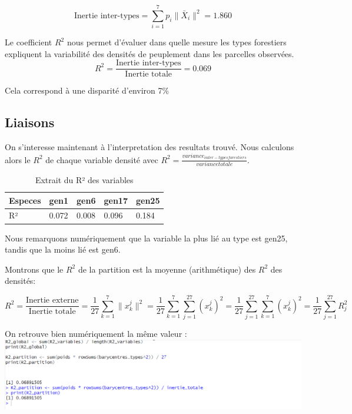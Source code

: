 \documentclass{article}
\begin{document}
\[
\text{Inertie inter-types} = \sum_{i=1}^{7} p_i \|\bar{X}_i\|^2 = 1.860
\]

Le coefficient $R^2$ nous permet d'évaluer dans quelle mesure les types forestiers expliquent la variabilité des densités de peuplement dans les parcelles observées.
\[
R^2 = \frac{\text{Inertie inter-types}}{\text{Inertie totale}}=0.069
\]

Cela correspond à une disparité d'environ 7\%

\subsection{Liaisons}

On s'interesse maintenant à l'interpretation des resultats trouvé. Nous calculons alors le $R^2$ de chaque variable densité avec
 $R^2 = \frac{variance_{inter -typesforestiers}}{variance totale}$.

\begin{table}[H]
    \centering
    \begin{tabular}{|l|l|l|l|l|}
    \hline
    Especes & gen1  & gen6  & gen17 & gen25 \\ \hline
    R²      & 0.072 & 0.008 & 0.096 & 0.184 \\ \hline
    \end{tabular}
    \centering
    \caption{Extrait du R² des variables}
    \end{table}


Nous remarquons numériquement que la variable la plus lié au type est gen25, tandis que la moins lié est gen6.

Montrons que le $R^2$ de la partition est la moyenne (arithmétique) des $R^2$ des densités:

\[
R^2 = \frac{\text{Inertie externe}}{\text{Inertie totale}}
= \frac{1}{27} \sum_{k=1}^{7} \lVert x_k^j \rVert^2
= \frac{1}{27} \sum_{k=1}^{7} \sum_{j=1}^{27} (x_k^j)^2
= \frac{1}{27} \sum_{j=1}^{27} \sum_{k=1}^{7} (x_k^j)^2
= \frac{1}{27} \sum_{j=1}^{27} R_j^2
\]

On retrouve bien numériquement la même valeur :
\\
\includegraphics[width=1.5\textwidth]{preuve_info_p1.png}
\end{document}
